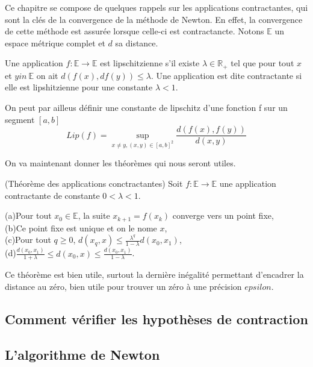 \documentclass[a4paper,10.5pt]{article}
\begin{document}
	Ce chapitre se compose de quelques rappels sur les applications contractantes, qui sont la clés de la convergence de la méthode de Newton. En effet, la convergence de cette méthode est assurée lorsque celle-ci est contractancte. 
	Notons $\mathbb{E}$ un espace métrique complet et $d$ sa distance.
	
	
	\begin{definition} Une application $f: \mathbb{E} \rightarrow \mathbb{E}$ est lipschitzienne s'il existe $\lambda \in \mathbb{R}_{+}$ tel que pour tout $x$ et $y in\ \mathbb{E}$ on ait $d(f(x),df(y)) \leq \lambda$. Une application est dite contractante si elle est lipshitzienne pour une constante $\lambda <1$. 
	\end{definition}
	On peut par ailleus définir une constante de lipschitz d'une fonction f sur un segment $[a,b]$
	\[Lip(f)=\sup_{x \neq y,(x,y)\in [a,b]^2} \frac{d(f(x),f(y))}{d(x,y)}\]
	
	On va maintenant donner les théorèmes qui nous seront utiles.
	\begin{theorem}(Théorème des applications conctractantes) Soit $f:\mathbb{E} \rightarrow \mathbb{E}$ une application contractante de constante $0<\lambda<1$.
		
		(a)Pour tout $x_0 \in \mathbb{E}$, la suite $x_{k+1}=f(x_k)$ converge vers un point fixe,\\
		
		(b)Ce point fixe est unique et on le nome $x$,\\
		
		(c)Pour tout $q \geq 0$, $d(x_q,x) \leq \frac{\lambda^q}{1-\lambda} d(x_0,x_1)$,\\
		
		(d)$\frac{d(x_0,x_1)}{1+\lambda} \leq d(x_0,x) \leq \frac{d(x_0,x_1)}{1-\lambda}$.
	\end{theorem}
	Ce théorème est bien utile, surtout la dernière inégalité permettant d'encadrer la distance au zéro, bien utile pour trouver un zéro à une précision $epsilon$. 
	
	\subsection{Comment vérifier les hypothèses de contraction} 
	
	\subsection{L'algorithme de Newton}
	
	
	
\end{document}
